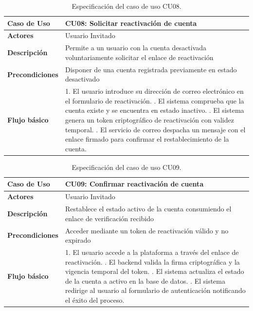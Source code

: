 \begin{table}[H]
\centering
\begin{tabular}{|p{3.1cm}|p{10.9cm}|}
\hline
\textbf{Caso de Uso} & \textbf{CU08: Solicitar reactivación de cuenta} \\ \hline
\textbf{Actores} & Usuario Invitado \\ \hline
\textbf{Descripción} & Permite a un usuario con la cuenta desactivada voluntariamente solicitar el enlace de reactivación \\ \hline
\textbf{Precondiciones} & Disponer de una cuenta registrada previamente en estado desactivado \\ \hline
\textbf{Flujo básico} & 
1. El usuario introduce su dirección de correo electrónico en el formulario de reactivación. \newline
2. El sistema comprueba que la cuenta existe y se encuentra en estado inactivo. \newline
3. El sistema genera un token criptográfico de reactivación con validez temporal. \newline
4. El servicio de correo despacha un mensaje con el enlace firmado para confirmar el restablecimiento de la cuenta. \\ \hline
\end{tabular}
\caption{Especificación del caso de uso CU08.}
\label{tab:cu08}
\end{table}

\begin{table}[H]
\centering
\begin{tabular}{|p{3.1cm}|p{10.9cm}|}
\hline
\textbf{Caso de Uso} & \textbf{CU09: Confirmar reactivación de cuenta} \\ \hline
\textbf{Actores} & Usuario Invitado \\ \hline
\textbf{Descripción} & Restablece el estado activo de la cuenta consumiendo el enlace de verificación recibido \\ \hline
\textbf{Precondiciones} & Acceder mediante un token de reactivación válido y no expirado \\ \hline
\textbf{Flujo básico} & 
1. El usuario accede a la plataforma a través del enlace de reactivación. \newline
2. El backend valida la firma criptográfica y la vigencia temporal del token. \newline
3. El sistema actualiza el estado de la cuenta a activo en la base de datos. \newline
4. El sistema redirige al usuario al formulario de autenticación notificando el éxito del proceso. \\ \hline
\end{tabular}
\caption{Especificación del caso de uso CU09.}
\label{tab:cu09}
\end{table}

